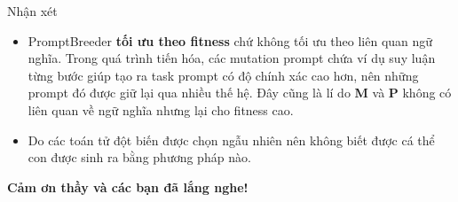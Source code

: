 \documentclass[english,main=vietnamese,xcolor=table]{beamer}
\begin{document}

\begin{frame}{Nhận xét}
\begin{itemize}
    \item PromptBreeder \textbf{tối ưu theo fitness} chứ không tối ưu theo liên quan ngữ nghĩa. Trong quá trình tiến hóa, các mutation prompt chứa ví dụ suy luận từng bước giúp tạo ra task prompt có độ chính xác cao hơn, nên những prompt đó được giữ lại qua nhiều thế hệ. Đây cũng là lí do \textbf{M} và \textbf{P} không có liên quan về ngữ nghĩa nhưng lại cho fitness cao.
    \item Do các toán tử đột biến được chọn ngẫu nhiên nên không biết được cá thể con được sinh ra bằng phương pháp nào.
\end{itemize}
\end{frame}

\begin{frame}
    \centering
    \vspace{1.5cm}
    {\Large \textbf{Cảm ơn thầy và các bạn đã lắng nghe!}}
\end{frame}
\end{document}
